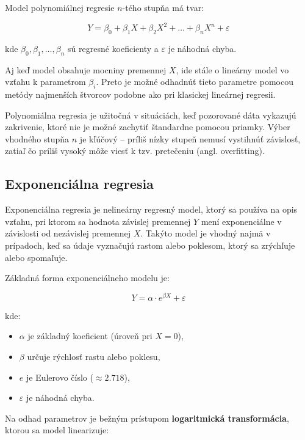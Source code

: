 Model polynomiálnej regresie $n$-tého stupňa má tvar:

\begin{equation}
Y = \beta_0 + \beta_1 X + \beta_2 X^2 + \dots + \beta_n X^n + \varepsilon
\end{equation}

kde $\beta_0, \beta_1, \dots, \beta_n$ sú regresné koeficienty a $\varepsilon$ je náhodná chyba.

Aj keď model obsahuje mocniny premennej $X$, ide stále o lineárny model vo vzťahu k parametrom $\beta_i$. Preto je možné odhadnúť tieto parametre pomocou metódy najmenších štvorcov podobne ako pri klasickej lineárnej regresii.

Polynomiálna regresia je užitočná v situáciách, keď pozorované dáta vykazujú zakrivenie, ktoré nie je možné zachytiť štandardne pomocou priamky. Výber vhodného stupňa $n$ je kľúčový – príliš nízky stupeň nemusí vystihnúť závislosť, zatiaľ čo príliš vysoký môže viesť k tzv. pretečeniu (angl. overfitting).

\subsection{Exponenciálna regresia}
\label{subsec:exponential_regression}

Exponenciálna regresia je nelineárny regresný model, ktorý sa používa na opis vzťahu, pri ktorom sa hodnota závislej premennej $Y$ mení exponenciálne v závislosti od nezávislej premennej $X$. Takýto model je vhodný najmä v prípadoch, keď sa údaje vyznačujú rastom alebo poklesom, ktorý sa zrýchľuje alebo spomaľuje.

Základná forma exponenciálneho modelu je:

\begin{equation}
Y = \alpha \cdot e^{\beta X} + \varepsilon
\end{equation}

kde:
\begin{itemize}
  \item $\alpha$ je základný koeficient (úroveň pri $X=0$),
  \item $\beta$ určuje rýchlosť rastu alebo poklesu,
  \item $e$ je Eulerovo číslo ($\approx 2.718$),
  \item $\varepsilon$ je náhodná chyba.
\end{itemize}

Na odhad parametrov je bežným prístupom \textbf{logaritmická transformácia}, ktorou sa model linearizuje:

